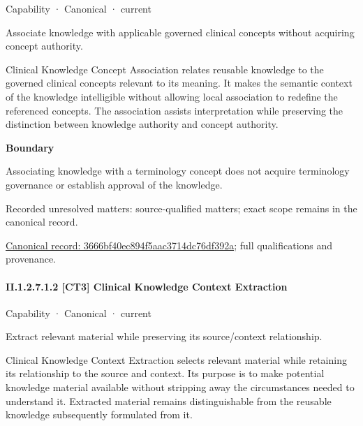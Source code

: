 \label{element:3666bf40ec894f5aac3714dc76df392a}
{\small Capability · Canonical · current}\par

Associate knowledge with applicable governed clinical concepts without acquiring concept authority.



Clinical Knowledge Concept Association relates reusable knowledge to the governed clinical concepts relevant to its meaning. It makes the semantic context of the knowledge intelligible without allowing local association to redefine the referenced concepts. The association assists interpretation while preserving the distinction between knowledge authority and concept authority.



\textbf{Boundary}



Associating knowledge with a terminology concept does not acquire terminology governance or establish approval of the knowledge.


{\small Recorded unresolved matters: source-qualified matters; exact scope remains in the canonical record.}\par
{\footnotesize \href{../../../../../../../continuum/strategy/capability/3666bf40ec894f5aac3714dc76df392a.md}{Canonical record: 3666bf40ec894f5aac3714dc76df392a}; full qualifications and provenance.}\par
\paragraph*{II.1.2.7.1.2 [CT3] Clinical Knowledge Context Extraction}
\label{navigation:II.1.2.7.1.2}

\label{element:0911997eb4584172afd10b1d37946061}
{\small Capability · Canonical · current}\par

Extract relevant material while preserving its source/context relationship.



Clinical Knowledge Context Extraction selects relevant material while retaining its relationship to the source and context. Its purpose is to make potential knowledge material available without stripping away the circumstances needed to understand it. Extracted material remains distinguishable from the reusable knowledge subsequently formulated from it.



